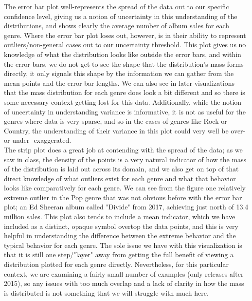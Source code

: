 The error bar plot well-represents the spread of the data out to our specific confidence level, giving us a notion of uncertainty in this understanding of the distributions, and shows clearly the average number of album sales for each genre. Where the error bar plot loses out, however, is in their ability to represent outliers/non-general cases out to our uncertainty threshold. This plot gives us no knowledge of what the distribution looks like outside the error bars, and within the error bars, we do not get to see the shape that the distribution's mass forms directly, it only signals this shape by the information we can gather from the mean points and the error bar lengths. We can also see in later visualizations that the mass distribution for each genre does look a bit different and so there is some necessary context getting lost for this data. Additionally, while the notion of uncertainty in understanding variance is informative, it is not as useful for the genres where data is very sparse, and so in the cases of genres like Rock or Country, the understanding of their variance in this plot could very well be over- or under- exaggerated.\\

The strip plot does a great job at contending with the spread of the data; as we saw in class, the density of the points is a very natural indicator of how the mass of the distribution is laid out across its domain, and we also get on top of that direct knowledge of what outliers exist for each genre and what that behavior looks like comparatively for each genre. We can see from the figure one relatively extreme outlier in the Pop genre that was not obvious before with the error bar plot; an Ed Sheeran album called "Divide" from 2017, achieving just north of 13.4 million sales. This plot also tends to include a mean indicator, which we have included as a distinct, opaque symbol overtop the data points, and this is very helpful in understanding the difference between the extreme behavior and the typical behavior for each genre. The sole issue we have with this visualization is that it is still one step/"layer" away from getting the full benefit of viewing a distribution plotted for each genre directly. Nevertheless, for this particular context, we are examining a fairly small number of examples (only releases after 2015), so any issues with too much overlap and a lack of clarity in how the mass is distributed is not something that we will struggle with much here.\\


